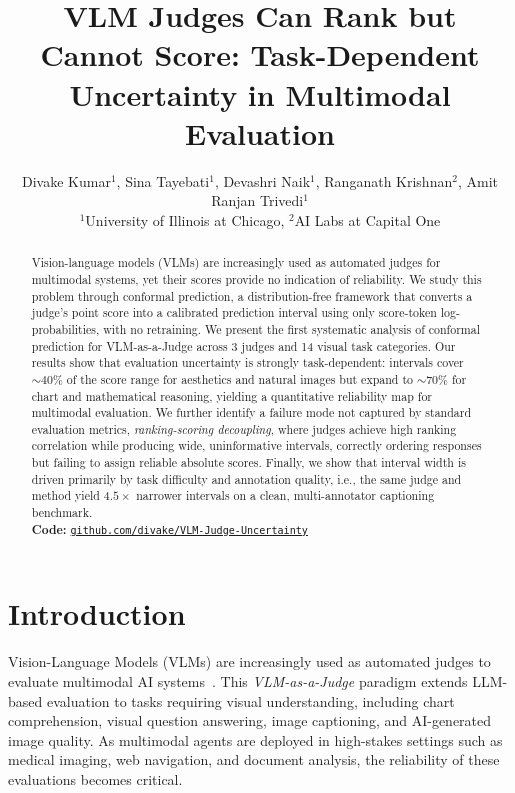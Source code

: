 \documentclass{article}
\title{VLM Judges Can Rank but Cannot Score: Task-Dependent Uncertainty in Multimodal Evaluation}
\author{Divake Kumar$^{1}$, Sina Tayebati$^{1}$, Devashri Naik$^{1}$, Ranganath Krishnan$^{2}$, Amit Ranjan Trivedi$^{1}$ \\[4pt]
$^{1}$University of Illinois at Chicago, $^{2}$AI Labs at Capital One
}
\begin{document}
\ifcolmsubmission
\linenumbers
\fi

\maketitle

\begin{abstract}
Vision-language models (VLMs) are increasingly used as automated judges for multimodal systems, yet their scores provide no indication of reliability. We study this problem through conformal prediction, a distribution-free framework that converts a judge's point score into a calibrated prediction interval using only score-token log-probabilities, with no retraining. 
We present the first systematic analysis of conformal prediction for VLM-as-a-Judge across 3 judges and 14 visual task categories. Our results show that evaluation uncertainty is strongly task-dependent: intervals cover $\sim 40\%$ of the score range for aesthetics and natural images but expand to $\sim 70\%$ for chart and mathematical reasoning, yielding a quantitative reliability map for multimodal evaluation. 
We further identify a failure mode not captured by standard evaluation metrics, \emph{ranking-scoring decoupling}, where judges achieve high ranking correlation while producing wide, uninformative intervals, correctly ordering responses but failing to assign reliable absolute scores. 
Finally, we show that interval width is driven primarily by task difficulty and annotation quality, i.e., the same judge and method yield $4.5\times$ narrower intervals on a clean, multi-annotator captioning benchmark. \\[4pt]
\textbf{Code:} \href{https://github.com/divake/VLM-Judge-Uncertainty}{\texttt{github.com/divake/VLM-Judge-Uncertainty}}
\end{abstract}

\section{Introduction}
\label{sec:intro}

Vision-Language Models (VLMs) are increasingly used as automated judges to evaluate multimodal AI systems~\citep{chen2024mllmasajudge,li2024vlrewardbench}. This \emph{VLM-as-a-Judge} paradigm extends LLM-based evaluation to tasks requiring visual understanding, including chart comprehension, visual question answering, image captioning, and AI-generated image quality. As multimodal agents are deployed in high-stakes settings such as medical imaging, web navigation, and document analysis, the reliability of these evaluations becomes critical. 
\end{document}
